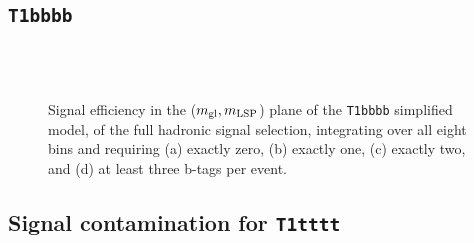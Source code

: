 \newpage
\subsection{\texttt{T1bbbb}\label{app:sig-eff-t1bbbb}}

\begin{figure}[h!]
  \begin{center}
     \\
     \\
    \caption{\label{fig:sig-eff-t1bbbb}Signal efficiency in the ($m_{\rm
        gl},m_{\rm LSP}$) plane of the \texttt{T1bbbb} simplified model,
      of the full hadronic signal selection, integrating over all
      eight \HT bins and requiring (a) exactly zero, (b) exactly
      one, (c) exactly two, and (d) at least three b-tags per event.}
  \end{center}
\end{figure}

\newpage
\subsection{Signal contamination for \texttt{T1tttt}\label{app:sig-eff-contam}}

